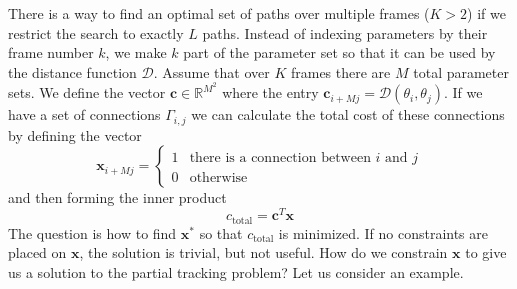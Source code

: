 \documentclass[letterpaper,12pt]{report}
\begin{document}
There is a way to find an optimal set of paths over multiple frames ($K > 2$) if
we restrict the search to exactly $L$ paths. Instead of indexing parameters by
their frame number $k$, we make $k$ part of the parameter set so that it can be
used by the distance function $\mathcal{D}$. Assume that over $K$ frames there
are $M$ total parameter sets. We define the vector $\boldsymbol{c} \in \mathbb{R}^{M^2}$
where the entry $\boldsymbol{c}_{i + Mj} = \mathcal{D} \left( \theta_{i}, \theta_{j}
\right)$. If we have a set of connections $\Gamma_{i,j}$ we can calculate the
total cost of these connections by defining the vector
\[
    \boldsymbol{x}_{i + Mj} = \begin{cases}
        1 & \text{there is a connection between }i\text{ and }j\\
        0 & \text{otherwise}
    \end{cases}
\]
and then forming the inner product
\[
    c_{\text{total}}=\boldsymbol{c}^{T}\boldsymbol{x}
\]
The question is how to find $\boldsymbol{x}^{\ast}$ so that $c_{\text{total}}$
is minimized. If no constraints are placed on $\boldsymbol{x}$, the solution is
trivial, but not useful. How do we constrain $\boldsymbol{x}$ to give us a
solution to the partial tracking problem? Let us consider an example.



\end{document}
